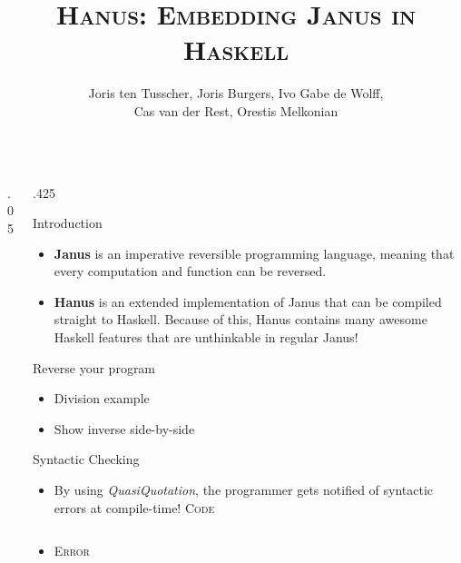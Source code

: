 \documentclass[final,hyperref={pdfpagelabels=false}]{beamer}
\title{\LARGE \textsc{Hanus: Embedding Janus in Haskell}} %
\author{\vspace{1cm} Joris ten Tusscher, Joris Burgers, Ivo Gabe de Wolff,\\ Cas van der Rest, Orestis Melkonian\vspace{1cm}} %
\institute{\Large \emph{Faculty of Science, Utrecht University}} %
\newcommand\sepsize{.05\textwidth}
\newcommand\colsize{.425\textwidth}
\newcommand{\code}[1]{\inputminted[frame=lines,framesep=1cm,baselinestretch=.9,linenos,fontsize=\scriptsize]{haskell}{code/#1.hs}}
\newcommand{\codeErr}[1]{\inputminted[frame=lines,framesep=1cm,baselinestretch=.9,fontsize=\scriptsize]{bash}{code/#1_err.hs}}
\begin{document}

\begin{frame}[t] %

\begin{columns}[t] %

\begin{column}{\sepsize}\end{column} %

\begin{column}{\colsize} %


\begin{block}{Introduction}
	\begin{itemize}
		\item \textbf{Janus} is an imperative reversible programming language, meaning that every computation and function can be reversed.
 		\item \textbf{Hanus} is an extended implementation of Janus that can be compiled straight to Haskell. Because of this, Hanus contains many awesome Haskell features that are unthinkable in regular Janus!
	\end{itemize}
\end{block}

\begin{block}{Reverse your program}
	\begin{itemize}
		\item Division example
		\item Show inverse side-by-side
	\end{itemize}
\end{block}

\begin{block}{Syntactic Checking}
	\begin{itemize}
		\item By using \textit{QuasiQuotation}, the programmer gets notified of syntactic errors at compile-time!
	\center
	\textsc{\small Code}\\ \vspace{1cm}
	\begin{minipage}{.8\textwidth}
	\code{syntax}
	\end{minipage}
	\vspace{1cm}
	\item \textsc{\small Error}\\ \vspace{1cm}
	\begin{minipage}{.8\textwidth}
	\codeErr{syntax}
	\end{minipage}
	\end{itemize}
\end{block}


\end{column}
\end{columns}
\end{frame}
\end{document}
